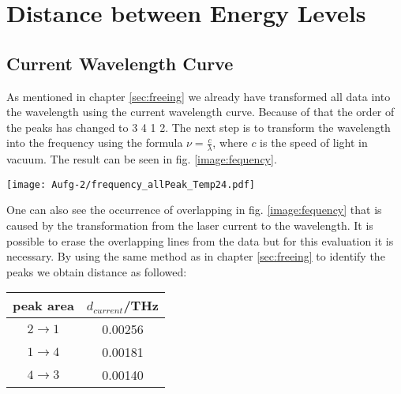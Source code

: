 \section{Distance between Energy Levels}
\label{sec:distance}
\subsection*{Current Wavelength Curve}
As mentioned in chapter \ref{sec:freeing} we already have transformed all data into the wavelength using the current wavelength curve. Because of that the order of the peaks has changed to 3 4 1 2. The next step is to transform the wavelength into the frequency using the formula $\nu=\frac{c}{\lambda}$, where $c$ is the speed of light in vacuum. The result can be seen in fig. \ref{image:fequency}.
\begin{center}
    \texttt{[image: Aufg-2/frequency\_allPeak\_Temp24.pdf]}
    \label{image:fequency}
\end{center}
One can also see the occurrence of overlapping in fig. \ref{image:fequency} that is caused by the transformation from the laser current to the wavelength. It is possible to erase the overlapping lines from the data but for this evaluation it is necessary.
By using the same method as in chapter \ref{sec:freeing} to identify the peaks we obtain distance as followed:
\begin{center}
    \begin{tabular}{c | c}
        peak area & $d_{current}$/THz\\
        \hline
        $2 \rightarrow 1$ & 0.00256\\
        $1 \rightarrow 4$ & 0.00181\\
        $4 \rightarrow 3$ & 0.00140\\
    \end{tabular}
    \label{tab:currentMethode}
\end{center}
